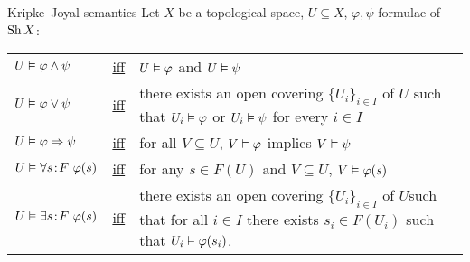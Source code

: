 \begin{frame}{ Kripke--Joyal semantics}
	Let $X$ be a topological space, $U \subseteq X$, $\varphi, \psi$ formulae of $\operatorname{Sh} X$:
	\vspace{-3ex}
	\begin{center}%
		\begin{tabular}{lcp{45ex}}
			$U \vDash \varphi \land \psi$ & \underline{iff} & $U \vDash \varphi$ and $U \vDash \psi$\\
			$U \vDash \varphi \lor \psi$ & \underline{iff} & there exists an open covering $\{U_i\}_{i \in I}$ of $U$ \newline such that $U_i \vDash \varphi$ or $U_i \vDash \psi$ for every $i \in I$\\
			$U \vDash \varphi \Rightarrow \psi$ & \underline{iff} & for all $V \subseteq U$, $V \vDash \varphi$ implies $V \vDash \psi$\\
			$U \vDash \forall s \!:\! F\ \varphi(s)$ & \underline{iff} & for any $s \in F(U)$ and $V \subseteq U$, $V \vDash \varphi(s)$\\
			$U \vDash \exists s \!:\! F\ \varphi(s)$ & \underline{iff} & there exists an open covering $\{U_i\}_{i \in I}$ of $U$\newline such that for all $i \in I$ there exists $s_i \in F(U_i)$ such that $U_i \vDash \varphi(s_i)$.
		\end{tabular}
	\end{center}
\end{frame}

